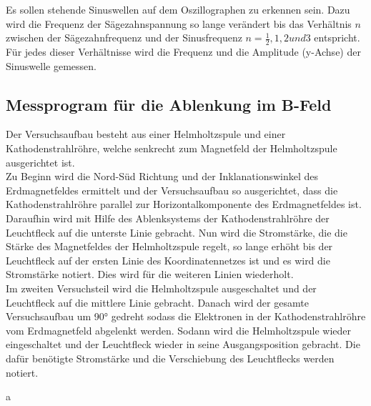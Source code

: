 Es sollen stehende Sinuswellen auf dem Oszillographen zu erkennen sein. Dazu wird die Frequenz der Sägezahnspannung so lange verändert bis das Verhältnis $n$ zwischen der Sägezahnfrequenz und der Sinusfrequenz $n = \frac{1}{2}, 1, 2 und 3$ entspricht. Für jedes dieser Verhältnisse wird die Frequenz und die Amplitude (y-Achse) der Sinuswelle gemessen.

\subsection{Messprogram für die Ablenkung im B-Feld}
Der Versuchsaufbau besteht aus einer Helmholtzspule und einer Kathodenstrahlröhre, welche senkrecht zum Magnetfeld der Helmholtzspule ausgerichtet ist. \\
Zu Beginn wird die Nord-Süd Richtung und der Inklanationswinkel des Erdmagnetfeldes ermittelt und der Versuchsaufbau so ausgerichtet, dass die Kathodenstrahlröhre parallel zur Horizontalkomponente des Erdmagnetfeldes ist. Daraufhin wird mit Hilfe des Ablenksystems der Kathodenstrahlröhre der Leuchtfleck auf die unterste Linie gebracht. Nun wird die Stromstärke, die die Stärke des Magnetfeldes der Helmholtzspule regelt, so lange erhöht bis der Leuchtfleck auf der ersten Linie des Koordinatennetzes ist und es wird die Stromstärke notiert. Dies wird für die weiteren Linien wiederholt. \\
Im zweiten Versuchsteil wird die Helmholtzspule ausgeschaltet und der Leuchtfleck auf die mittlere Linie gebracht. Danach wird der gesamte Versuchsaufbau um 90° gedreht sodass die Elektronen in der Kathodenstrahlröhre vom Erdmagnetfeld abgelenkt werden. Sodann wird die Helmholtzspule wieder eingeschaltet und der Leuchtfleck wieder in seine Ausgangsposition gebracht. Die dafür benötigte Stromstärke und die Verschiebung des Leuchtflecks werden notiert.





















a
